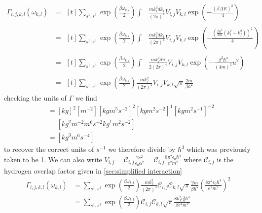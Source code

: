 \begin{align}
  \Gamma_{i,j, k,l}(\omega_{k,l}) & =\begin{aligned}[t]
    \sum_{s^1,s^3} \exp{(\frac{\beta \omega_{k,l}}{2})} \int &
    \frac{m k_1^3 dk_1}{{(2\pi)}^4}
    V_{i,j} V_{k,l} \exp{(- \frac{{(\beta \Delta E)}^2}{4})}
  \end{aligned} \\
                                  & =\begin{aligned}[t]
    \sum_{s^1,s^3} \exp{(\frac{\beta \omega_{k,l}}{2})} \int &
    \frac{m k_1^3 dk_1}{{(2\pi)}^4}
    V_{i,j} V_{k,l} \exp{(- \frac{{(\frac{\beta \hbar^2}{2 m}(k_1^2 - k_f^2))}^2}{4})}
  \end{aligned} \\
                                  & =\begin{aligned}[t]
    \sum_{s^1,s^3} \exp{(\frac{\beta \omega_{k,l}}{2})} \int &
    \frac{m k_f^2 du}{2{(2\pi)}^4}
    V_{i,j} V_{k,l} \exp{(- \frac{\beta^2 \hbar^4}{{(4m)}^2} u^2)}
  \end{aligned} \\
                                  & =\begin{aligned}[t]
    \sum_{s^1,s^3} \exp{(\frac{\beta \omega_{k,l}}{2})} \frac{m k_f^2 }{{(2\pi)}^4}
    V_{i,j} V_{k,l} \sqrt{\pi} \frac{2m}{\beta \hbar^2}
  \end{aligned}
\end{align}
checking the units of \(\Gamma \) we find
\begin{align}
  [\Gamma] & = {[kg]}^2[m^{-2}]{[kgm^5s^{-2}]}^2{[kgm^2s^{-2}]}^{1}{[kg m^2 s^{-1}]}^{-2} \\
           & = [{kg}^2 m^{-2} m^{6} s^{-2} {kg}^{1} m^{2} s^{-2}]                         \\
           & = [{kg}^3 m^{6}s^{-4}]
\end{align}
to recover the correct units of \(s^{-1}\) we
therefore divide by \(\hbar^3 \) which was previously
taken to be 1. We can also write
\(V_{i,j}
= \mathcal{C}_{i,j} \frac{2e^2}{\epsilon_0 \alpha^2}
= \mathcal{C}_{i,j} \frac{8 \pi^2 \epsilon_0 \hbar^4}{e^2 m^2}\)
where \(\mathcal{C}_{i,j}\) is the hydrogen
overlap factor given in \cref{sec:simplified interaction}
\begin{align}
  \Gamma_{i,j, k,l}(\omega_{k,l}) & =
  \sum_{s^1,s^3} \exp{(\frac{\beta \omega_{k,l}}{2})}
  \frac{m k_f^2 }{{(2\pi)}^4}
  \mathcal{C}_{i,j} \mathcal{C}_{k,l}
  \sqrt{\pi} \frac{2m}{\beta \hbar^5} {(\frac{8 \pi^2 \epsilon_0 \hbar^4}{e^2 m^2})}^2 \\
                                  & =
  \sum_{s^1,s^3} \exp{(\frac{\beta \omega_{k,l}}{2})}
  \mathcal{C}_{i,j} \mathcal{C}_{k,l}
  \sqrt{\pi} \frac{8 k_f^2 \epsilon_0^2 \hbar^3}{\beta e^4 m^2}
\end{align}

